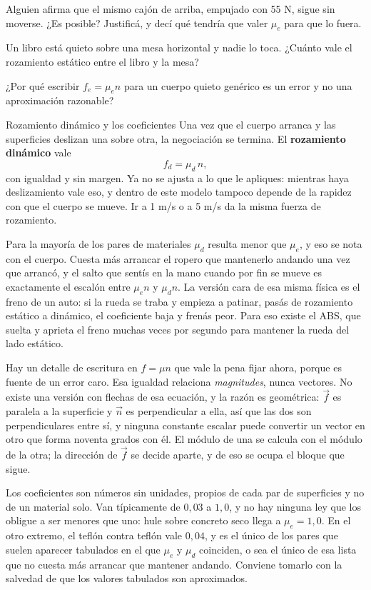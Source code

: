 \documentclass[11pt,openany]{book}
\begin{document}
\begin{chequeo}
\item Alguien afirma que el mismo cajón de arriba, empujado con 55 N, sigue sin moverse. ¿Es posible? Justificá, y decí qué tendría que valer $\mu_e$ para que lo fuera.
\item Un libro está quieto sobre una mesa horizontal y nadie lo toca. ¿Cuánto vale el rozamiento estático entre el libro y la mesa?
\item ¿Por qué escribir $f_e = \mu_e n$ para un cuerpo quieto genérico es un error y no una aproximación razonable?
\end{chequeo}

\begin{bloque}{Rozamiento dinámico y los coeficientes}
Una vez que el cuerpo arranca y las superficies deslizan una sobre otra, la negociación se termina. El \textbf{rozamiento dinámico} vale
\[
f_d = \mu_d\, n ,
\]
con igualdad y sin margen. Ya no se ajusta a lo que le apliques: mientras haya deslizamiento vale eso, y dentro de este modelo tampoco depende de la rapidez con que el cuerpo se mueve. Ir a 1 m/s o a 5 m/s da la misma fuerza de rozamiento.

Para la mayoría de los pares de materiales $\mu_d$ resulta menor que $\mu_e$, y eso se nota con el cuerpo. Cuesta más arrancar el ropero que mantenerlo andando una vez que arrancó, y el salto que sentís en la mano cuando por fin se mueve es exactamente el escalón entre $\mu_e n$ y $\mu_d n$. La versión cara de esa misma física es el freno de un auto: si la rueda se traba y empieza a patinar, pasás de rozamiento estático a dinámico, el coeficiente baja y frenás peor. Para eso existe el ABS, que suelta y aprieta el freno muchas veces por segundo para mantener la rueda del lado estático.

Hay un detalle de escritura en $f = \mu n$ que vale la pena fijar ahora, porque es fuente de un error caro. Esa igualdad relaciona \emph{magnitudes}, nunca vectores. No existe una versión con flechas de esa ecuación, y la razón es geométrica: $\vec f$ es paralela a la superficie y $\vec n$ es perpendicular a ella, así que las dos son perpendiculares entre sí, y ninguna constante escalar puede convertir un vector en otro que forma noventa grados con él. El módulo de una se calcula con el módulo de la otra; la dirección de $\vec f$ se decide aparte, y de eso se ocupa el bloque que sigue.

Los coeficientes son números sin unidades, propios de cada par de superficies y no de un material solo. Van típicamente de $0{,}03$ a $1{,}0$, y no hay ninguna ley que los obligue a ser menores que uno: hule sobre concreto seco llega a $\mu_e = 1{,}0$. En el otro extremo, el teflón contra teflón vale $0{,}04$, y es el único de los pares que suelen aparecer tabulados en el que $\mu_e$ y $\mu_d$ coinciden, o sea el único de esa lista que no cuesta más arrancar que mantener andando. Conviene tomarlo con la salvedad de que los valores tabulados son aproximados.


\end{bloque}
\end{document}
